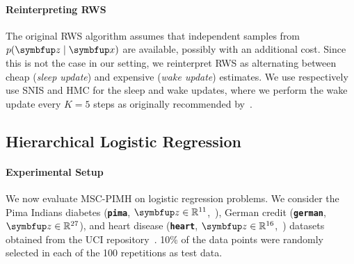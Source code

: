 \paragraph{Reinterpreting RWS}
The original RWS algorithm assumes that independent samples from \(p(\vz\mid\vx)\) are available, possibly with an additional cost.
Since this is not the case in our setting, we reinterpret RWS as alternating between cheap (\textit{sleep update}) and expensive (\textit{wake update}) estimates.
We use respectively use SNIS and HMC for the sleep and wake updates, where we perform the wake update every \(K=5\) steps as originally recommended by~\citet{DBLP:journals/corr/BornscheinB14}.


\subsection{Hierarchical Logistic Regression}\label{section:logistic}
\vspace{-0.05in}
\paragraph{Experimental Setup}
We now evaluate MSC-PIMH on logistic regression problems.
We consider the Pima Indians diabetes (\textbf{\texttt{pima}}, \(\vz \in \mathbb{R}^{11}\),~\citealt{smith_using_1988}), German credit (\textbf{\texttt{german}}, \(\vz \in \mathbb{R}^{27}\)), and heart disease (\textbf{\texttt{heart}}, \(\vz \in \mathbb{R}^{16}\),~\citealt{detrano_international_1989}) datasets obtained from the UCI repository~\citep{Dua:2019}.
10\% of the data points were randomly selected in each of the 100 repetitions as test data.

